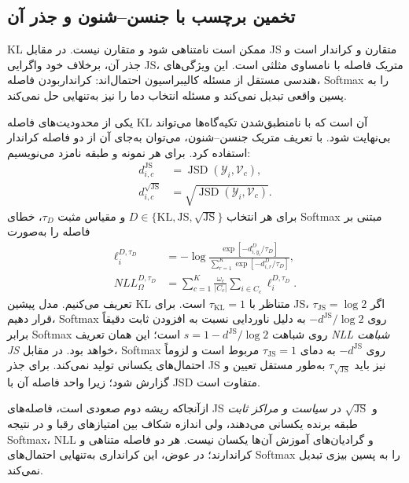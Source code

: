 \subsection{تخمین برچسب با جنسن--شنون و جذر آن}
\label{subsec:ch3-NLL-JS-sqrt-variants}

KL ممکن است نامتناهی شود و متقارن نیست.
در مقابل JS متقارن و کراندار است و
جذر آن، برخلاف خود واگرایی JS،
متریک فاصله با نامساوی مثلثی است.
این ویژگی‌های هندسی مستقل از مسئله
کالیبراسیون احتمال‌اند: کرانداربودن
فاصله، Softmax را به پسین واقعی تبدیل
نمی‌کند و مسئله انتخاب دما را نیز
به‌تنهایی حل نمی‌کند.

یکی از محدودیت‌های فاصله KL آن است که با نامنطبق‌شدن
تکیه‌گاه‌ها می‌تواند بی‌نهایت شود. با تعریف متریک
جنسن--شنون، می‌توان به‌جای آن از دو فاصله کراندار
استفاده کرد. برای هر نمونه و طبقه نامزد می‌نویسیم:
\begin{equation}\label{eq:ch3-NLL-JS-distances}
\begin{aligned}
d^{\mathrm{JS}}_{i,c}
&=\operatorname{JSD}(\mathscr Y_i,\mathcal V_c),\\
d^{\sqrt{\mathrm{JS}}}_{i,c}
&=\sqrt{\operatorname{JSD}(\mathscr Y_i,\mathcal V_c)}.
\end{aligned}
\end{equation}
برای هر انتخاب $D\in\{\mathrm{KL},\mathrm{JS},
\sqrt{\mathrm{JS}}\}$ و مقیاس مثبت
$\tau_D$، خطای Softmax مبتنی بر فاصله را به‌صورت
\begin{equation}\label{eq:ch3-NLL-distance-family}
\boxed{
\begin{aligned}
\ell_i^{D,\tau_D}
&=-\log\frac{\exp[-d^D_{i,y_i}/\tau_D]}
{\sum_{r=1}^{K}\exp[-d^D_{i,r}/\tau_D]},\\
NLL^{D,\tau_D}_\Omega
&=\sum_{c=1}^{K}\frac{\omega_c}{|C_c|}
\sum_{i\in C_c}\ell_i^{D,\tau_D}.
\end{aligned}}
\end{equation}
تعریف می‌کنیم. مدل پیشین KL متناظر با $\tau_{\mathrm{KL}}=1$
است. برای JS، اگر $\tau_{\mathrm{JS}}=\log2$ قرار دهیم،
Softmax روی $-d^{\mathrm{JS}}/\log2$ به دلیل
ناوردایی نسبت به افزودن ثابت دقیقاً برابر Softmax
روی شباهت $s=1-d^{\mathrm{JS}}/\log2$ است؛
این همان تعریف \emph{NLL شباهت JS} خواهد بود.
در مقابل، Softmax روی $-d^{\mathrm{JS}}$
به دمای $\tau_{\mathrm{JS}}=1$ مربوط است و
لزوماً احتمال‌های یکسانی تولید نمی‌کند.
برای جذر JS نیز باید $\tau_{\sqrt{\mathrm{JS}}}$
به‌طور مستقل تعیین و گزارش شود؛ زیرا واحد
فاصله آن با JSD متفاوت است.

ازآنجاکه ریشه دوم صعودی است،
فاصله‌های JS و $\sqrt{\mathrm{JS}}$ در
\emph{سیاست و مراکز ثابت} طبقه برنده یکسانی
می‌دهند، ولی اندازه شکاف بین امتیازهای رقبا
و در نتیجه Softmax، NLL و گرادیان‌های آموزش
آن‌ها یکسان نیست. هر دو فاصله متناهی و کراندارند؛
در عوض، این کرانداری به‌تنهایی احتمال‌های
Softmax را به پسین بیزی تبدیل نمی‌کند.

